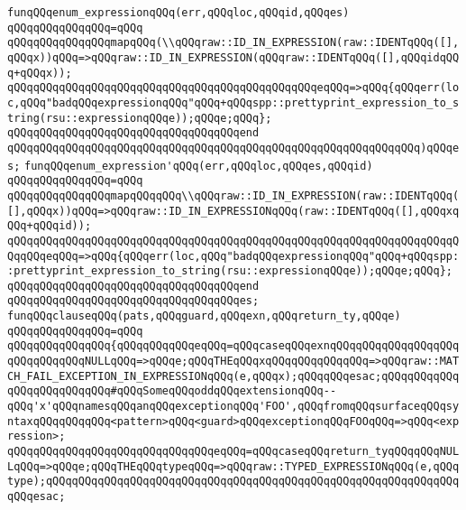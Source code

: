 \verb|funqQQqenum_expressionqQQq(err,qQQqloc,qQQqid,qQQqes)|\newline
\verb|qQQqqQQqqQQqqQQq=qQQq|\newline
\verb|qQQqqQQqqQQqqQQqmapqQQq(\\qQQqraw::ID_IN_EXPRESSION(raw::IDENTqQQq([],qQQqx))qQQq=>qQQqraw::ID_IN_EXPRESSION(qQQqraw::IDENTqQQq([],qQQqidqQQq+qQQqx));|\newline
\verb|qQQqqQQqqQQqqQQqqQQqqQQqqQQqqQQqqQQqqQQqqQQqqQQqeqQQq=>qQQq{qQQqerr(loc,qQQq"badqQQqexpressionqQQq"qQQq+qQQqspp::prettyprint_expression_to_string(rsu::expressionqQQqe));qQQqe;qQQq};|\newline
\verb|qQQqqQQqqQQqqQQqqQQqqQQqqQQqqQQqqQQqend|\newline
\verb|qQQqqQQqqQQqqQQqqQQqqQQqqQQqqQQqqQQqqQQqqQQqqQQqqQQqqQQqqQQqqQQq)qQQqes;|\newline
\newline
\verb|funqQQqenum_expression'qQQq(err,qQQqloc,qQQqes,qQQqid)|\newline
\verb|qQQqqQQqqQQqqQQq=qQQq|\newline
\verb|qQQqqQQqqQQqqQQqmapqQQqqQQq\\qQQqraw::ID_IN_EXPRESSION(raw::IDENTqQQq([],qQQqx))qQQq=>qQQqraw::ID_IN_EXPRESSIONqQQq(raw::IDENTqQQq([],qQQqxqQQq+qQQqid));|\newline
\verb|qQQqqQQqqQQqqQQqqQQqqQQqqQQqqQQqqQQqqQQqqQQqqQQqqQQqqQQqqQQqqQQqqQQqqQQqqQQqeqQQq=>qQQq{qQQqerr(loc,qQQq"badqQQqexpressionqQQq"qQQq+qQQqspp::prettyprint_expression_to_string(rsu::expressionqQQqe));qQQqe;qQQq};|\newline
\verb|qQQqqQQqqQQqqQQqqQQqqQQqqQQqqQQqqQQqend|\newline
\newline
\verb|qQQqqQQqqQQqqQQqqQQqqQQqqQQqqQQqqQQqes;|\newline
\newline
\verb|funqQQqclauseqQQq(pats,qQQqguard,qQQqexn,qQQqreturn_ty,qQQqe)|\newline
\verb|qQQqqQQqqQQqqQQq=qQQq|\newline
\verb|qQQqqQQqqQQqqQQq{qQQqqQQqqQQqeqQQq=qQQqcaseqQQqexnqQQqqQQqqQQqqQQqqQQqqQQqqQQqqQQqNULLqQQq=>qQQqe;qQQqTHEqQQqxqQQqqQQqqQQqqQQq=>qQQqraw::MATCH_FAIL_EXCEPTION_IN_EXPRESSIONqQQq(e,qQQqx);qQQqqQQqesac;qQQqqQQqqQQqqQQqqQQqqQQqqQQq#qQQqSomeqQQqoddqQQqextensionqQQq--qQQq'x'qQQqnamesqQQqanqQQqexceptionqQQq'FOO',qQQqfromqQQqsurfaceqQQqsyntaxqQQqqQQqqQQq<pattern>qQQq<guard>qQQqexceptionqQQqFOOqQQq=>qQQq<expression>;|\newline
\verb|qQQqqQQqqQQqqQQqqQQqqQQqqQQqqQQqeqQQq=qQQqcaseqQQqreturn_tyqQQqqQQqNULLqQQq=>qQQqe;qQQqTHEqQQqtypeqQQq=>qQQqraw::TYPED_EXPRESSIONqQQq(e,qQQqtype);qQQqqQQqqQQqqQQqqQQqqQQqqQQqqQQqqQQqqQQqqQQqqQQqqQQqqQQqqQQqqQQqqQQqesac;|\newline
